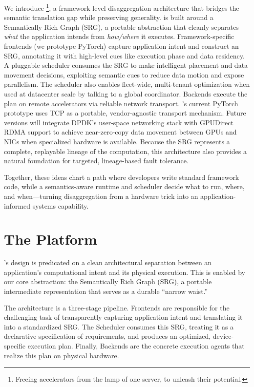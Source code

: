 We introduce \sys\footnote{Freeing accelerators from the lamp of one server, to unleash their potential.}, 
a framework-level disaggregation architecture that bridges the semantic translation gap while preserving generality.
\sys is built around a Semantically Rich Graph (SRG), a portable abstraction that cleanly separates \emph{what} the application intends from \emph{how/where} it executes.
Framework-specific frontends (we prototype PyTorch) capture application intent and construct an SRG,
annotating it with high-level cues like execution phase and data residency.
A pluggable scheduler consumes the SRG to make intelligent placement and data movement decisions, exploiting semantic cues to reduce data motion and expose parallelism.
The scheduler also enables fleet-wide, multi-tenant optimization when used at datacenter scale by talking to a global coordinator.
Backends execute the plan on remote accelerators via reliable network transport.
\sys's current PyTorch prototype uses TCP as a portable, vendor-agnostic transport mechanism. Future versions will integrate DPDK's user-space networking stack with GPUDirect RDMA support to achieve near-zero-copy data movement between GPUs and NICs when specialized hardware is available.
Because the SRG represents a complete, replayable lineage of the computation, this architecture also provides a natural foundation for targeted, lineage-based fault tolerance.

Together, these ideas chart a path where developers write standard framework code, while a semantics-aware runtime and scheduler decide what to run, where, and when---turning disaggregation from a hardware trick into an application-informed systems capability.
\section{The \sys Platform}
\label{sec:framework}

\sys's design is predicated on a clean architectural separation between an application's computational intent and its physical execution. 
This is enabled by our core abstraction: the Semantically Rich Graph (SRG), a portable intermediate representation that serves as a durable ``narrow waist.''

The architecture is a three-stage pipeline. 
Frontends are responsible for the challenging task of transparently capturing application intent and translating it into a standardized SRG. 
The Scheduler consumes this SRG, treating it as a declarative specification of requirements, and produces an optimized, device-specific execution plan. 
Finally, Backends are the concrete execution agents that realize this plan on physical hardware.

